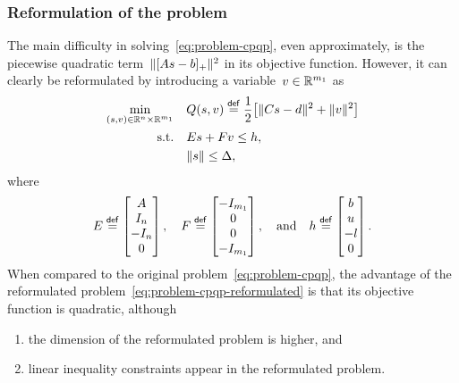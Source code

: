 \subsubsection{Reformulation of the problem}

The main difficulty in solving~\cref{eq:problem-cpqp}, even approximately, is the piecewise quadratic term~$\norm{\posp{A \sstep - b}}^2$ in its objective function.
However, it can clearly be reformulated by introducing a variable~$v \in \mathbb{R}^{m_1}$ as
\begin{subequations}
    \label{eq:problem-cpqp-reformulated}
    \begin{align}
        \min_{(\sstep, v) \in \R^n \times \R^{m_1}} & \quad Q(\sstep, v) \eqdef \frac{1}{2} \big[ \norm{C \sstep - d}^2 + \norm{v}^2 \big]\\
        \text{s.t.}                                 & \quad E \sstep + F v \le h,\\
                                                    & \quad \norm{\sstep} \le \rad,
    \end{align}
\end{subequations}
where
\begin{equation*}
    E \mathrel{\stackrel{\mathsf{def}}{=}}
    \begin{bmatrix}
        A\\
        I_n\\
        -I_n\\
        0
    \end{bmatrix}, \quad
    F \mathrel{\stackrel{\mathsf{def}}{=}}
    \begin{bmatrix}
        -I_{m_1}\\
        0\\
        0\\
        -I_{m_1}
    \end{bmatrix}, \quad \text{and} \quad
    h \mathrel{\stackrel{\mathsf{def}}{=}}
    \begin{bmatrix}
        b\\
        u\\
        -l\\
        0
    \end{bmatrix}.
\end{equation*}
When compared to the original problem~\cref{eq:problem-cpqp}, the advantage of the reformulated problem~\cref{eq:problem-cpqp-reformulated} is that its objective function is quadratic, although
\begin{enumerate}
    \item the dimension of the reformulated problem is higher, and
    \item linear inequality constraints appear in the reformulated problem.
\end{enumerate}

